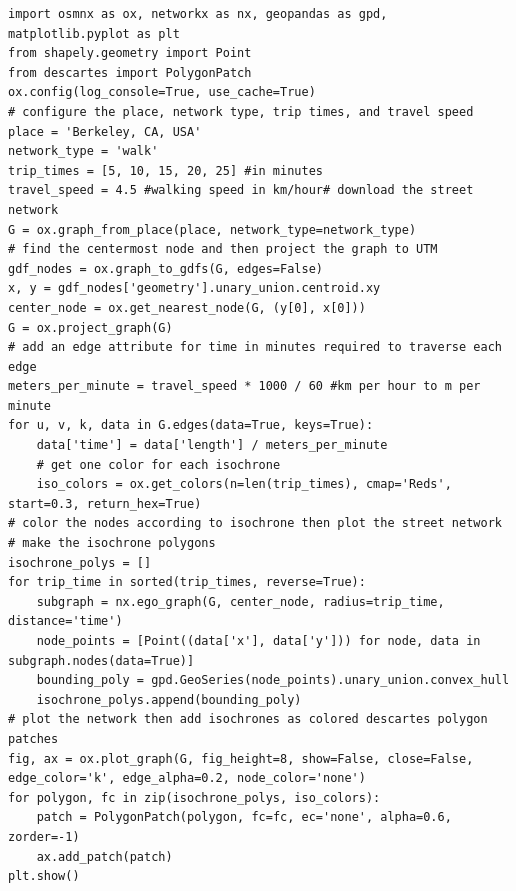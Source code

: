 \begin{verbatim}
import osmnx as ox, networkx as nx, geopandas as gpd, matplotlib.pyplot as plt
from shapely.geometry import Point
from descartes import PolygonPatch
ox.config(log_console=True, use_cache=True)
# configure the place, network type, trip times, and travel speed
place = 'Berkeley, CA, USA'
network_type = 'walk'
trip_times = [5, 10, 15, 20, 25] #in minutes
travel_speed = 4.5 #walking speed in km/hour# download the street network
G = ox.graph_from_place(place, network_type=network_type)
# find the centermost node and then project the graph to UTM
gdf_nodes = ox.graph_to_gdfs(G, edges=False)
x, y = gdf_nodes['geometry'].unary_union.centroid.xy
center_node = ox.get_nearest_node(G, (y[0], x[0]))
G = ox.project_graph(G)
# add an edge attribute for time in minutes required to traverse each edge
meters_per_minute = travel_speed * 1000 / 60 #km per hour to m per minute
for u, v, k, data in G.edges(data=True, keys=True):
	data['time'] = data['length'] / meters_per_minute
	# get one color for each isochrone
	iso_colors = ox.get_colors(n=len(trip_times), cmap='Reds', start=0.3, return_hex=True)
# color the nodes according to isochrone then plot the street network
# make the isochrone polygons
isochrone_polys = []
for trip_time in sorted(trip_times, reverse=True):
	subgraph = nx.ego_graph(G, center_node, radius=trip_time, distance='time')
	node_points = [Point((data['x'], data['y'])) for node, data in subgraph.nodes(data=True)]
	bounding_poly = gpd.GeoSeries(node_points).unary_union.convex_hull
	isochrone_polys.append(bounding_poly)
# plot the network then add isochrones as colored descartes polygon patches
fig, ax = ox.plot_graph(G, fig_height=8, show=False, close=False, edge_color='k', edge_alpha=0.2, node_color='none')
for polygon, fc in zip(isochrone_polys, iso_colors):
	patch = PolygonPatch(polygon, fc=fc, ec='none', alpha=0.6, zorder=-1)
	ax.add_patch(patch)
plt.show()

\end{verbatim}

